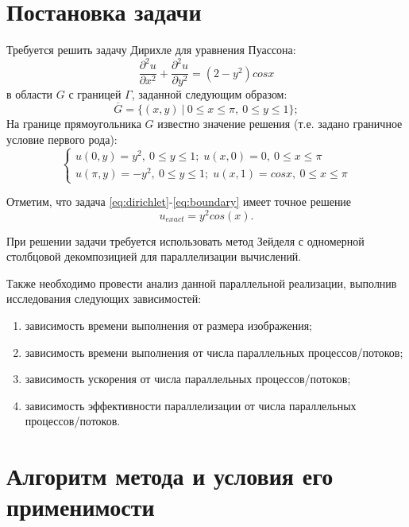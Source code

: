 \section{Постановка задачи}
Требуется решить задачу Дирихле для уравнения Пуассона:
\begin{equation}
	\label{eq:dirichlet}
	\frac{\partial^2 u}{\partial x^2} + \frac{\partial^2 u}{\partial y^2} = 
	(2 - y^2) cos x
\end{equation}
в области $G$ с границей $\Gamma$, заданной следующим образом:
\begin{equation}
	\label{eq:G}
	\overline{G} = \{(x, y) \: | \: 0 \leqslant x \leqslant \pi, \: 0 \leqslant y \leqslant 1\};
\end{equation}
На границе прямоугольника $G$ известно значение решения (т.е. задано граничное условие первого рода):
\begin{equation}
	\label{eq:boundary}
	\begin{cases}
		u(0, y) = y^2, \: 0 \leqslant y \leqslant 1; \; u(x, 0) = 0, \: 0 \leqslant x \leqslant \pi \\
		
		u(\pi, y) =-y^2, \: 0 \leqslant y \leqslant 1; \; u(x, 1) = cos x, \: 0 \leqslant x \leqslant \pi
	\end{cases}
\end{equation}

Отметим, что задача \eqref{eq:dirichlet}-\eqref{eq:boundary} имеет точное решение
\begin{equation*}
	u_{exact} = y^2 cos(x).
\end{equation*}

При решении задачи требуется использовать метод Зейделя с одномерной столбцовой декомпозицией для параллелизации вычислений. 

Также необходимо провести анализ данной параллельной реализации, выполнив исследования следующих зависимостей:
\begin{enumerate}
	\item зависимость времени выполнения от размера изображения;
	\item зависимость времени выполнения от числа параллельных процессов/потоков;
	\item зависимость ускорения от числа параллельных процессов/потоков;
	\item зависимость эффективности параллелизации от числа параллельных процессов/потоков.
\end{enumerate}
\section{Алгоритм метода и условия его применимости}
